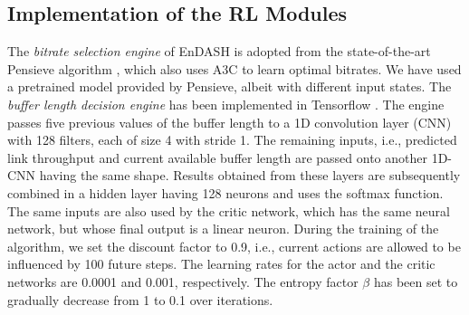 \subsection{Implementation of the \ac{RL} Modules}
The \textit{bitrate selection engine} of EnDASH is adopted from the state-of-the-art Pensieve algorithm \cite{mao2017neural}, which also uses A3C to learn optimal bitrates. We have used a pretrained model provided by Pensieve, albeit with different input states.  The \textit{buffer length decision engine} has been implemented in Tensorflow \cite{Abadi2016}. The engine passes five previous values of the buffer length to a 1D convolution layer (CNN) with 128 filters, each of size 4 with stride 1. The remaining inputs, i.e., predicted link throughput and current available buffer length are passed onto another 1D-CNN having the same shape. Results obtained from these layers are subsequently combined in a hidden layer having 128 neurons and uses the softmax function. The same inputs are also used by the critic network, which has the same neural network, but whose final output is a linear neuron. During the training of the algorithm, we set the discount factor to 0.9, i.e., current actions are allowed to be influenced by 100 future steps. The learning rates for the actor and the critic networks are 0.0001 and 0.001, respectively. The entropy factor $\beta$ has been set to gradually decrease from 1 to 0.1 over iterations.
